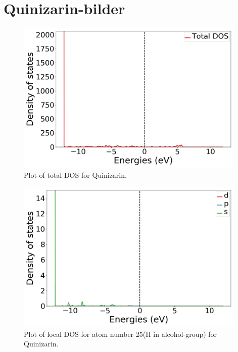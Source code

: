 \documentclass{article}
\begin{document}
\section{Quinizarin-bilder}



  \begin{figure}[H]
      \centering
      \includegraphics[width = 11cm]{../fig/basic_TDOS_1.png}
      \caption{Plot of total DOS for Quinizarin. }
      \label{fig:basic_TDOS_1}
  \end{figure}

  \begin{figure}[H]
      \centering
      \includegraphics[width = 11cm]{../fig/basic_LDOS25_1.png}
      \caption{Plot of local DOS for atom number 25(H in alcohol-group) for Quinizarin.}
      \label{fig:basic_LDOS25_1}
  \end{figure}
\end{document}
